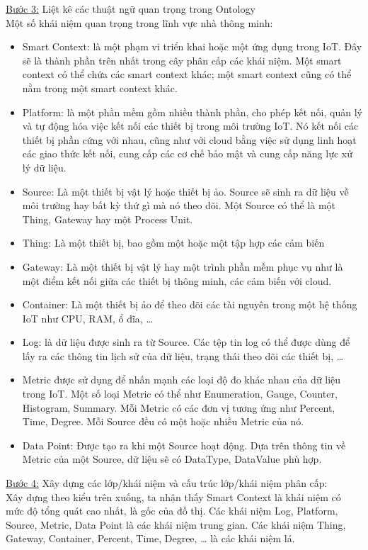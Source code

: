 \underline{Bước 3:} Liệt kê các thuật ngữ quan trọng trong Ontology	\\
Một số khái niệm quan trọng trong lĩnh vực nhà thông minh: 
\begin{itemize}
	\item Smart Context: là một phạm vi triển khai hoặc một ứng dụng trong IoT. Đây sẽ là thành phần trên nhất trong cây phân cấp các khái niệm. Một smart context có thể chứa các smart context khác; một smart context cũng có thể nằm trong một smart context khác.
	\item Platform: là một phần mềm gồm nhiều thành phần, cho phép kết nối, quản lý và tự động hóa việc kết nối các thiết bị trong môi trường IoT. Nó kết nối các thiết bị phần cứng với nhau, cũng như với cloud bằng việc sử dụng linh hoạt các giao thức kết nối, cung cấp các cơ chế bảo mật và cung cấp năng lực xử lý dữ liệu.
	\item Source: Là một thiết bị vật lý hoặc thiết bị ảo. Source sẽ sinh ra dữ liệu về môi trường hay bất kỳ thứ gì mà nó theo dõi. Một Source có thể là một Thing, Gateway hay một Process Unit.
	\item Thing: Là một thiết bị, bao gồm một hoặc một tập hợp các cảm biến
	\item Gateway: Là một thiết bị vật lý hay một trình phần mềm phục vụ như là một điểm kết nối giữa các thiết bị thông minh, các cảm biến với cloud.
	\item Container: Là một thiết bị ảo để theo dõi các tài nguyên trong một hệ thống IoT như CPU, RAM, ổ đĩa, …
	\item Log: là dữ liệu được sinh ra từ Source. Các tệp tin log có thể được dùng để lấy ra các thông tin lịch sử của dữ liệu, trạng thái theo dõi các thiết bị, …
	\item Metric được sử dụng để nhấn mạnh các loại độ đo khác nhau của dữ liệu trong IoT.  Một số loại Metric có thể như Enumeration, Gauge, Counter, Histogram, Summary. Mỗi Metric có các đơn vị tương ứng như Percent, Time, Degree. Mỗi Source đều có một hoặc nhiều Metric của nó.
	\item Data Point: Được tạo ra khi một Source hoạt động. Dựa trên thông tin về Metric của một Source, dữ liệu sẽ có DataType, DataValue phù hợp.
\end{itemize}
\underline{Bước 4:} Xây dựng các lớp/khái niệm và cấu trúc lớp/khái niệm phân cấp: \\
Xây dựng theo kiểu trên xuống, ta nhận thấy Smart Context là khái niệm có mức độ tổng quát cao nhất, là gốc của đồ thị. Các khái niệm Log, Platform, Source, Metric, Data Point là các khái niệm trung gian. Các khái niệm Thing, Gateway, Container, Percent, Time, Degree, … là các khái niệm lá. 

